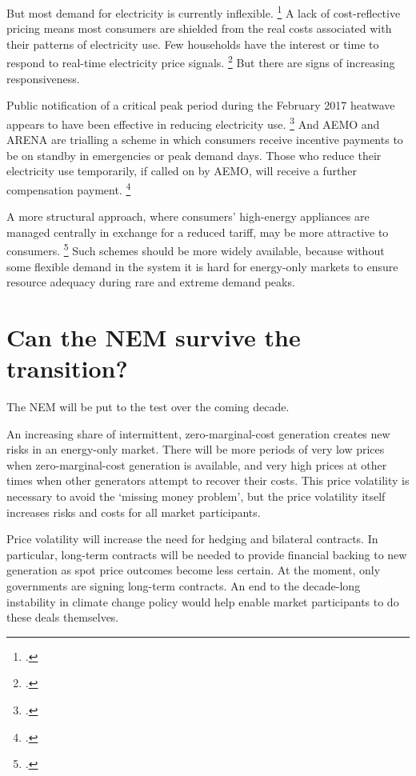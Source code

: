 \documentclass[FrontPage]{grattan}
\begin{document}
But most demand for electricity is currently inflexible.%
\footcites{AEMO2017ESOO}{CSIRO2015CostReflectivePricing}{fan2011price}{reiss2005household}
A lack of cost-reflective pricing means most consumers are shielded from the real costs associated with their patterns of electricity use. Few households have the interest or time to respond to real-time electricity price signals.%
\footcite{CSIRO2015CostReflectivePricing}
But there are signs of increasing responsiveness. 

Public notification of a critical peak period during the February 2017 heatwave appears to have been effective in reducing electricity use.%
\footcite{OKane2017EnergySecurityTaskforceInitialReport}
And AEMO and ARENA are trialling a scheme in which consumers receive incentive payments to be on standby in emergencies or peak demand days. Those who reduce their electricity use temporarily, if called on by AEMO, will receive a further compensation payment.%
\footcite{AEMOARENA2017DemandTrial}

A more structural approach, where consumers' high-energy appliances are managed centrally in exchange for a reduced tariff, may be more attractive to consumers.%
\footcite{CSIRO2015CostReflectivePricing}
Such schemes should be more widely available, because without some flexible demand in the system it is hard for energy-only markets to ensure resource adequacy during rare and extreme demand peaks.

\section{Can the NEM survive the transition?}\label{sec:can-the-nem-survive-the-transition}
The NEM will be put to the test over the coming decade.

An increasing share of intermittent, zero-marginal-cost generation creates new risks in an energy-only market. There will be more periods of very low prices when zero-marginal-cost generation is available, and very high prices at other times when other generators attempt to recover their costs. This price volatility is necessary to avoid the `missing money problem', but the price volatility itself increases risks and costs for all market participants. 

Price volatility will increase the need for hedging and bilateral contracts. In particular, long-term contracts will be needed to provide financial backing to new generation as spot price outcomes become less certain. At the moment, only governments are signing long-term contracts. An end to the decade-long instability in climate change policy would help enable market participants to do these deals themselves. 
\end{document}

